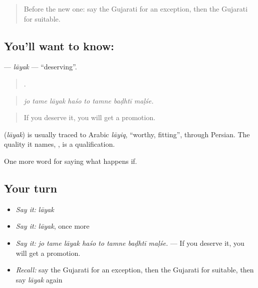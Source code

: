 \label{lesson:GU-C543-layak}



\begin{quote}
Before the new one: say the Gujarati for an exception, then the Gujarati for suitable.
\end{quote}

\subsection*{You'll want to know: }
\textbf{} — \emph{lāyak} — \textquotedblleft{}deserving\textquotedblright{}.

\begin{quote}
       .
\end{quote}

\begin{quote}
\emph{jo tame lāyak haśo to tamne baḍhtī maḷśe.}
\end{quote}

\begin{quote}
If you deserve it, you will get a promotion.
\end{quote}

\begin{cousinweb}
\textbf{} (\emph{lāyak}) is usually traced to Arabic \emph{lāyiq}, \textquotedblleft{}worthy, fitting\textquotedblright{}, through Persian. The quality it names, \textbf{}, is a qualification.
\end{cousinweb}

\begin{grammarlens}[title={What you've built}]
One more word for saying what happens if.
\end{grammarlens}

\subsection*{Your turn}
\begin{itemize}
\raggedright
  \item \emph{Say it:} \emph{lāyak}
  \item \emph{Say it:} \emph{lāyak}, once more
  \item \emph{Say it:} \emph{jo tame lāyak haśo to tamne baḍhtī maḷśe.} — If you deserve it, you will get a promotion.
  \item \emph{Recall:} say the Gujarati for an exception, then the Gujarati for suitable, then say \emph{lāyak} again
\end{itemize}

